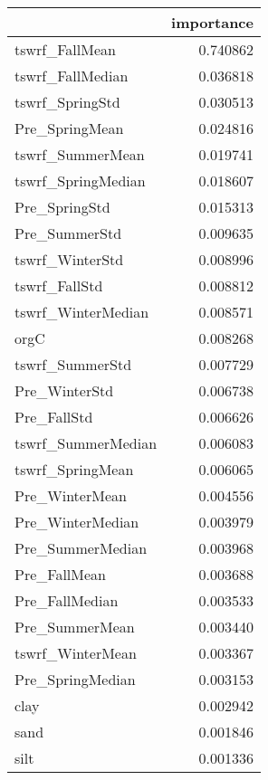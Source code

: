\begin{tabular}{lr}
\toprule
 & importance \\
\midrule
tswrf_FallMean & 0.740862 \\
tswrf_FallMedian & 0.036818 \\
tswrf_SpringStd & 0.030513 \\
Pre_SpringMean & 0.024816 \\
tswrf_SummerMean & 0.019741 \\
tswrf_SpringMedian & 0.018607 \\
Pre_SpringStd & 0.015313 \\
Pre_SummerStd & 0.009635 \\
tswrf_WinterStd & 0.008996 \\
tswrf_FallStd & 0.008812 \\
tswrf_WinterMedian & 0.008571 \\
orgC & 0.008268 \\
tswrf_SummerStd & 0.007729 \\
Pre_WinterStd & 0.006738 \\
Pre_FallStd & 0.006626 \\
tswrf_SummerMedian & 0.006083 \\
tswrf_SpringMean & 0.006065 \\
Pre_WinterMean & 0.004556 \\
Pre_WinterMedian & 0.003979 \\
Pre_SummerMedian & 0.003968 \\
Pre_FallMean & 0.003688 \\
Pre_FallMedian & 0.003533 \\
Pre_SummerMean & 0.003440 \\
tswrf_WinterMean & 0.003367 \\
Pre_SpringMedian & 0.003153 \\
clay & 0.002942 \\
sand & 0.001846 \\
silt & 0.001336 \\
\bottomrule
\end{tabular}
